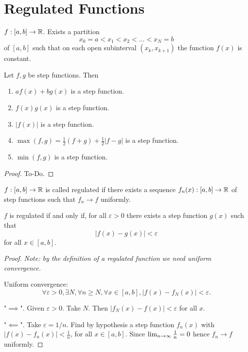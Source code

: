 \chapter{Regulated Functions}\label{cha:regfuncs}

\begin{definition}\label{def:step_func}
    $f : [a, b] \to \mathbb{R}$.
    Exists a partition
    \[
    x_0 = a < x_1 < x_2 < \dotsc < x_N = b
    \]
    of $[a, b]$ such that on each open subinterval $(x_k, x_{k + 1})$ the function $f(x)$ is constant.
\end{definition}

\begin{proposition}\label{prop:step_colt}
    Let $f, g$ be step functions.
    Then
    \begin{enumerate}[label = (\roman*)]
        \item $af(x) + bg(x)$ is a step function.

        \item $f(x)g(x)$ is a step function.

        \item $|f(x)|$ is a step function.

        \item $\max(f, g) = \frac{1}{2}(f + g) + \frac{1}{2}|f - g|$ is a step function.

        \item $\min(f, g)$ is a step function.
    \end{enumerate}
\end{proposition}
\begin{proof}
    To-Do.
\end{proof}

\begin{definition}\label{def:reg_func}
    $f : [a, b] \to \mathbb{R}$ is called regulated if there exists a sequence $f_n(x) : [a, b] \to \mathbb{R}$ of step functions such that $f_n \to f$ uniformly.
\end{definition}

\begin{lemma}\label{lem:seq_free_char}
    $f$ is regulated if and only if,
    for all $\varepsilon > 0$ there exists a step function $g(x)$ such that
    \[
    |f(x) - g(x)| < \varepsilon
    \]
    for all $x \in [a, b]$.
\end{lemma}
\begin{proof}
    \textit{Note:
    by the definition of a regulated function we need uniform convergence.}
    
    Uniform convergence:
    \[
    \forall \varepsilon > 0, \exists N, \forall n \geq N, \forall x \in [a, b], |f(x) - f_N(x)| < \varepsilon.
    \]
    
    "$\implies$".
    Given $\varepsilon > 0$.
    Take $N$.
    Then $|f_N(x) - f(x)| < \varepsilon$ for all $x$.

    "$\impliedby$".
    Take $\varepsilon = 1 / n$.
    Find by hypothesis a step function $f_n(x)$ with $|f(x) - f_n(x)| < \frac{1}{n}$,
    for all $x \in [a, b]$.
    Since $\lim_{n \rightarrow \infty}\frac{1}{n} = 0$ hence $f_n \to f$ uniformly.
\end{proof}

